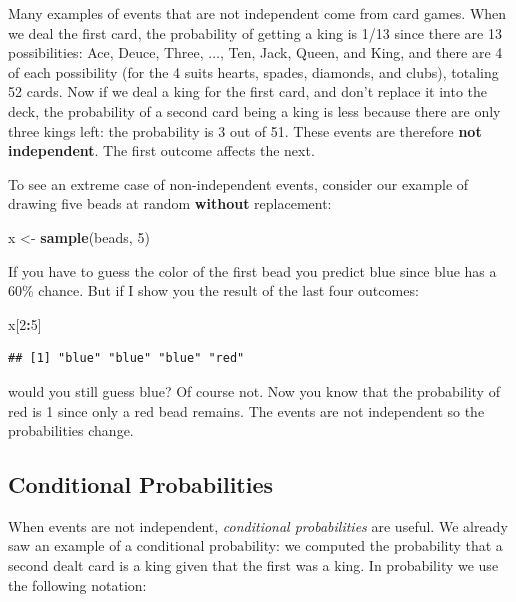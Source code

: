 \documentclass[
  openany]{book}
\newenvironment{Shaded}{\begin{snugshade}}{\end{snugshade}}
\newcommand{\DecValTok}[1]{\textcolor[rgb]{0.00,0.00,0.81}{#1}}
\newcommand{\KeywordTok}[1]{\textcolor[rgb]{0.13,0.29,0.53}{\textbf{#1}}}
\newcommand{\NormalTok}[1]{#1}
\newcommand{\OperatorTok}[1]{\textcolor[rgb]{0.81,0.36,0.00}{\textbf{#1}}}
\newcommand{\StringTok}[1]{\textcolor[rgb]{0.31,0.60,0.02}{#1}}
\begin{document}
Many examples of events that are not independent come from card games. When we deal the first card, the probability of getting a king is 1/13 since there are 13 possibilities: Ace, Deuce, Three, \(\dots\), Ten, Jack, Queen, and King, and there are 4 of each possibility (for the 4 suits hearts, spades, diamonds, and clubs), totaling 52 cards. Now if we deal a king for the first card, and don't replace it into the deck, the probability of a second card being a king is less because there are only three kings left: the probability is 3 out of 51. These events are therefore \textbf{not independent}. The first outcome affects the next.

To see an extreme case of non-independent events, consider our example of drawing five beads at random \textbf{without} replacement:

\begin{Shaded}
\begin{Highlighting}[]
\NormalTok{x <-}\StringTok{ }\KeywordTok{sample}\NormalTok{(beads, }\DecValTok{5}\NormalTok{)}
\end{Highlighting}
\end{Shaded}

If you have to guess the color of the first bead you predict blue since blue has a 60\% chance. But if I show you the result of the last four outcomes:

\begin{Shaded}
\begin{Highlighting}[]
\NormalTok{x[}\DecValTok{2}\OperatorTok{:}\DecValTok{5}\NormalTok{]}
\end{Highlighting}
\end{Shaded}

\begin{verbatim}
## [1] "blue" "blue" "blue" "red"
\end{verbatim}

would you still guess blue? Of course not. Now you know that the probability of red is 1 since only a red bead remains. The events are not independent so the probabilities change.

\hypertarget{conditional-probabilities}{%
\subsection{Conditional Probabilities}\label{conditional-probabilities}}

When events are not independent, \emph{conditional probabilities} are useful. We already saw an example of a conditional probability: we computed the probability that a second dealt card is a king given that the first was a king. In probability we use the following notation:
\end{document}
